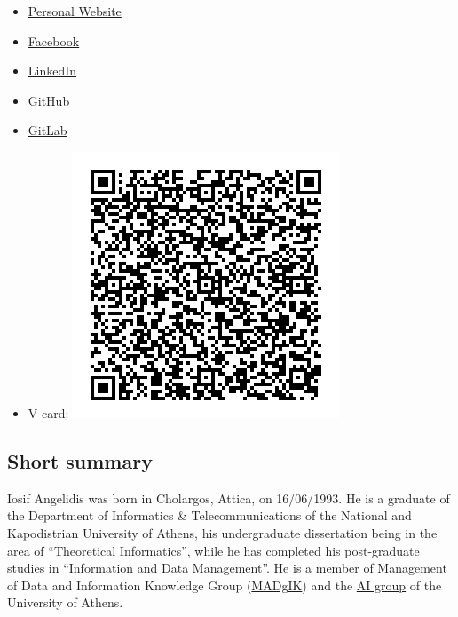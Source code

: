 \documentclass[a4paper,oneside,11pt]{article}
\begin{document}
\begin{itemize}

\item \href{https://iosang.github.io}{Personal Website}

\item \href{https://www.facebook.com/metimdjai}{Facebook}

\item \href{https://www.linkedin.com/in/iosif-angelidis/}{LinkedIn}

\item \href{https://github.com/metimdjai}{GitHub}

\item \href{https://gitlab.com/metimdjai}{GitLab}

\item V-card: \includegraphics[scale=0.5]{qr.png}%

\end{itemize}

\newpage

\subsection*{Short summary}

\begin{sloppypar}
	Iosif Angelidis was born in Cholargos, Attica, on 16/06/1993. He is a graduate of the Department
	of Informatics \& Telecommunications of the National and Kapodistrian University of Athens, his undergraduate 
	dissertation being in the area of ``Theoretical Informatics'', while he has completed his post-graduate studies in ``Information and Data
	Management''. He is a member of Management of Data and Information Knowledge Group
	(\href{http://www.madgik.di.uoa.gr}{MADgIK}) and the \href{http://ai.di.uoa.gr/}{AI group} of the University of Athens.
\end{sloppypar}
\end{document}

